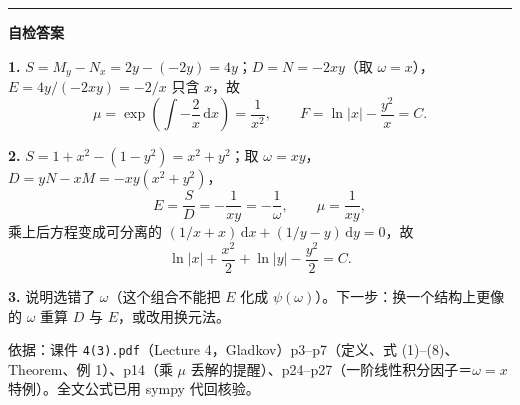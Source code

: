 \documentclass[11pt,a4paper]{ctexart}
\newcommand{\dd}{\mathrm{d}}
\begin{document}
\vspace{0.3em}
\noindent\rule{\linewidth}{0.6pt}
{\small
\textbf{自检答案}

\textbf{1.} $S=M_y-N_x=2y-(-2y)=4y$；$D=N=-2xy$（取 $\omega=x$），$E=4y/(-2xy)=-2/x$ 只含 $x$，故
\[
\mu=\exp\!\left(\int-\frac{2}{x}\,\dd x\right)=\frac{1}{x^{2}},
\qquad
F=\ln|x|-\frac{y^{2}}{x}=C .
\]

\textbf{2.} $S=1+x^{2}-(1-y^{2})=x^{2}+y^{2}$；取 $\omega=xy$，$D=yN-xM=-xy(x^{2}+y^{2})$，
\[
E=\frac{S}{D}=-\frac{1}{xy}=-\frac{1}{\omega},
\qquad
\mu=\frac{1}{xy},
\]
乘上后方程变成可分离的 $(1/x+x)\,\dd x+(1/y-y)\,\dd y=0$，故
\[
\ln|x|+\frac{x^{2}}{2}+\ln|y|-\frac{y^{2}}{2}=C .
\]

\textbf{3.} 说明选错了 $\omega$（这个组合不能把 $E$ 化成 $\psi(\omega)$）。下一步：换一个结构上更像的 $\omega$ 重算 $D$ 与 $E$，或改用换元法。

}
\vspace{0.2em}
\vspace{0.4em}
{\footnotesize 依据：课件 \texttt{4(3).pdf}（Lecture 4，Gladkov）p3--p7（定义、式 (1)--(8)、Theorem、例 1）、p14（乘 $\mu$ 丢解的提醒）、p24--p27（一阶线性积分因子＝$\omega=x$ 特例）。全文公式已用 sympy 代回核验。}
\end{document}
